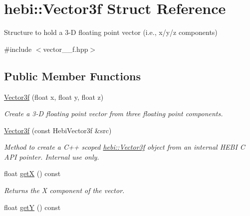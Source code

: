 \hypertarget{structhebi_1_1Vector3f}{}\section{hebi\+:\+:Vector3f Struct Reference}
\label{structhebi_1_1Vector3f}


Structure to hold a 3-\/D floating point vector (i.\+e., x/y/z components)  




{\ttfamily \#include $<$vector\+\_\+\_\+f.\+hpp$>$}

\subsection*{Public Member Functions}
\begin{DoxyCompactItemize}
\item 
\hyperlink{structhebi_1_1Vector3f_acde62a94c708091af51e133b76423505}{Vector3f} (float x, float y, float z)\hypertarget{structhebi_1_1Vector3f_acde62a94c708091af51e133b76423505}{}\label{structhebi_1_1Vector3f_acde62a94c708091af51e133b76423505}

\begin{DoxyCompactList}\small\item\em Create a 3-\/D floating point vector from three floating point components. \end{DoxyCompactList}\item 
\hyperlink{structhebi_1_1Vector3f_a7edaecafef5df6250ce2d72c3a9830d8}{Vector3f} (const Hebi\+Vector3f \&src)\hypertarget{structhebi_1_1Vector3f_a7edaecafef5df6250ce2d72c3a9830d8}{}\label{structhebi_1_1Vector3f_a7edaecafef5df6250ce2d72c3a9830d8}

\begin{DoxyCompactList}\small\item\em Method to create a C++ scoped \hyperlink{structhebi_1_1Vector3f}{hebi\+::\+Vector3f} object from an internal H\+E\+BI C A\+PI pointer. Internal use only. \end{DoxyCompactList}\item 
float \hyperlink{structhebi_1_1Vector3f_addc31da9b56506c51bd56e7f6db5deda}{getX} () const \hypertarget{structhebi_1_1Vector3f_addc31da9b56506c51bd56e7f6db5deda}{}\label{structhebi_1_1Vector3f_addc31da9b56506c51bd56e7f6db5deda}

\begin{DoxyCompactList}\small\item\em Returns the X component of the vector. \end{DoxyCompactList}\item 
float \hyperlink{structhebi_1_1Vector3f_a8564aa2ab2f815fa077a61d2705b1693}{getY} () const \hypertarget{structhebi_1_1Vector3f_a8564aa2ab2f815fa077a61d2705b1693}{}\label{structhebi_1_1Vector3f_a8564aa2ab2f815fa077a61d2705b1693}


\end{DoxyCompactItemize}
